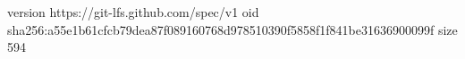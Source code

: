 version https://git-lfs.github.com/spec/v1
oid sha256:a55e1b61cfcb79dea87f089160768d978510390f5858f1f841be31636900099f
size 594
